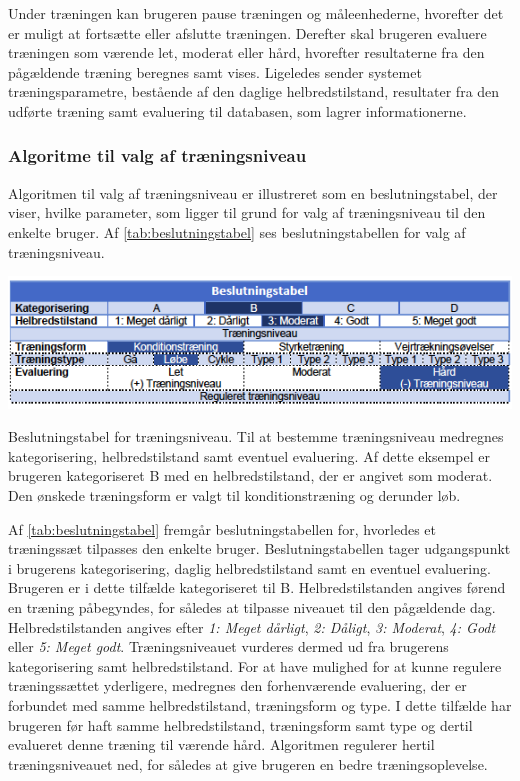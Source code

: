 Under træningen kan brugeren pause træningen og måleenhederne, hvorefter det er muligt at fortsætte eller afslutte træningen. Derefter skal brugeren evaluere træningen som værende let, moderat eller hård, hvorefter resultaterne fra den pågældende træning beregnes samt vises. Ligeledes sender systemet træningsparametre, bestående af den daglige helbredstilstand, resultater fra den udførte træning samt evaluering til databasen, som lagrer informationerne. 

\subsubsection*{Algoritme til valg af træningsniveau}
Algoritmen til valg af træningsniveau er illustreret som en beslutningstabel, der viser, hvilke parameter, som ligger til grund for valg af træningsniveau til den enkelte bruger. Af \autoref{tab:beslutningstabel} ses beslutningstabellen for valg af træningsniveau.

\begin{table}[H]
\centering
\includegraphics[width=1\textwidth]{figures/aktivitetsdiagram/beslutningstabel}
\caption{Beslutningstabel for træningsniveau. Til at bestemme træningsniveau medregnes kategorisering, helbredstilstand samt eventuel evaluering. Af dette eksempel er brugeren kategoriseret B med en helbredstilstand, der er angivet som moderat. Den ønskede træningsform er valgt til konditionstræning og derunder løb.}
\label{tab:beslutningstabel}
\end{table} 

\noindent
Af \autoref{tab:beslutningstabel} fremgår beslutningstabellen for, hvorledes et træningssæt tilpasses den enkelte bruger. Beslutningstabellen tager udgangspunkt i brugerens kategorisering, daglig helbredstilstand samt en eventuel evaluering. Brugeren er i dette tilfælde kategoriseret til B. Helbredstilstanden angives førend en træning påbegyndes, for således at tilpasse niveauet til den pågældende dag. Helbredstilstanden angives efter \textit{1: Meget dårligt}, \textit{2: Dåligt}, \textit{3: Moderat}, \textit{4: Godt} eller \textit{5: Meget godt}.
Træningsniveauet vurderes dermed ud fra brugerens kategorisering samt helbredstilstand. 
For at have mulighed for at kunne regulere træningssættet yderligere, medregnes den forhenværende evaluering, der er forbundet med samme helbredstilstand, træningsform og type. I dette tilfælde har brugeren før haft samme helbredstilstand, træningsform samt type og dertil evalueret denne træning til værende hård. Algoritmen regulerer hertil træningsniveauet ned, for således at give brugeren en bedre træningsoplevelse. 
